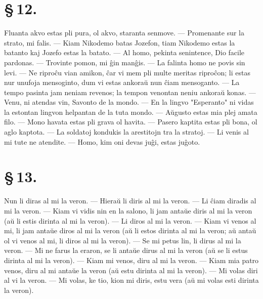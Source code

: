 \section*{\S\,12.}
Fluanta akvo estas pli pura, ol akvo, staranta senmove.
--- Promenante sur la strato, mi falis. --- Kiam Nikodemo batas
Jozefon, tiam Nikodemo estas la batanto kaj Jozefo estas la batato.
--- Al homo, pekinta senintence, Dio facile pardonas. --- Trovinte
pomon, mi \^gin man\^gis. --- La falinta homo ne povis sin levi. ---
Ne ripro\^cu vian amikon, \^car vi mem pli multe meritas ripro\^con;
li estas nur unufoja mensoginto, dum vi estas ankora\u u nun \^ciam
mensoganto. --- La tempo pasinta jam neniam revenos; la tempon
venontan neniu ankora\u u konas. --- Venu, ni atendas vin, Savonto
de la mondo. --- En la lingvo "Esperanto" ni vidas la estontan
lingvon helpantan de la tuta mondo. --- A\u ugusto estas mia plej
amata filo. --- Mono havata estas pli grava ol havita. --- Pasero
kaptita estas pli bona, ol aglo kaptota. --- La soldatoj kondukis la
arestitojn tra la stratoj. --- Li venis al mi tute ne atendite.
--- Homo, kim oni devas ju\^gi, estas ju\^goto.

\section*{\S\,13.}
Nun li diras al mi la veron. --- Hiera\u u li diris al mi la veron.
--- Li \^ciam diradis al mi la veron. --- Kiam vi vidis nin en la
salono, li jam anta\u ue diris al mi la veron (a\u u li estis
dirinta al mi la veron). --- Li diros al mi la veron. --- Kiam vi
venos al mi, li jam anta\u ue diros al mi la veron (a\u u li estos
dirinta al mi la veron; a\u u anta\u u ol vi venos al mi, li diros
al mi la veron). --- Se mi petus lin, li dirus al mi la veron. ---
Mi ne farus la eraron, se li anta\u ue dirus al mi la veron (a\u u
se li estus dirinta al mi la veron). --- Kiam mi venos, diru al mi
la veron. --- Kiam mia patro venos, diru al mi anta\u ue la veron
(a\u u estu dirinta al mi la veron). --- Mi volas diri al vi la
veron. --- Mi volas, ke tio, kion mi diris, estu vera (a\u u mi
volas esti dirinta la veron).

